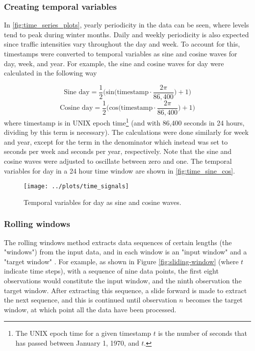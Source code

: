 \subsubsection{Creating temporal variables}
In \cref{fig:time_series_plots}, yearly periodicity in the data can be seen, where levels tend to peak during winter months. Daily and weekly periodicity is also expected since traffic intensities vary throughout the day and week. 
To account for this, timestamps were converted to temporal variables as sine and cosine waves for day, week, and year. For example, the sine and cosine waves for day were calculated in the following way

$$ \text{Sine day} = \frac{1}{2} \Big( \text{sin} \Big (\text{timestamp} \cdot \frac{2\pi}{86,400} \Big) + 1 \Big)$$
$$ \text{Cosine day} = \frac{1}{2} \Big( \text{cos} \Big (\text{timestamp} \cdot \frac{2\pi}{86,400} \Big) + 1 \Big)$$
where timestamp is in UNIX epoch time\footnote{The UNIX epoch time for a given timestamp $t$ is the number of seconds that has passed between January 1, 1970, and $t$.} (and with 86,400 seconds in 24 hours, dividing by this term is necessary). The calculations were done similarly for week and year, except for the term in the denominator which instead was set to seconds per week and seconds per year, respectively. Note that the sine and cosine waves were adjusted to oscillate between zero and one. The temporal variables for day in a 24 hour time window are shown in \vref{fig:time_sine_cos}.

\begin{figure}[h] 
\begin{center}
\texttt{[image: ../plots/time\_signals]}
\caption{Temporal variables for day as sine and cosine waves.}
\label{fig:time_sine_cos}
\end{center}
\end{figure}

\subsubsection{Rolling windows}
The rolling windows method extracts data sequences of certain lengths (the "windows") from the input data, and in each window is an "input window" and a "target window" \cite{Gilik2021}. For example, as shown in Figure \ref{fig:sliding-window}  (where $t$ indicate time steps), with a sequence of nine data points, the first eight observations would constitute the input window, and the ninth observation the target window. After extracting this sequence, a slide forward is made to extract the next sequence, and this is continued until observation $n$ becomes the target window, at which point all the data have been processed.%

